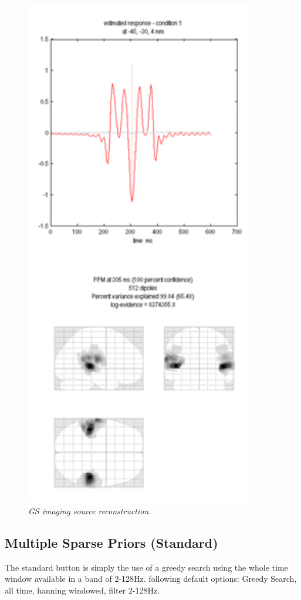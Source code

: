 \begin{figure}
\begin{center}
\includegraphics[width=100mm]{meg_sloc/Slide8}
\caption{\em GS imaging source reconstruction.\label{meg_sloc:fig:8}}
\end{center}
\end{figure}

\subsection{Multiple Sparse Priors (Standard)}
The standard button is simply the use of a greedy search using the whole time window available in a band of 2-128Hz. following default options: Greedy Search, all time, hanning windowed, filter 2-128Hz.

